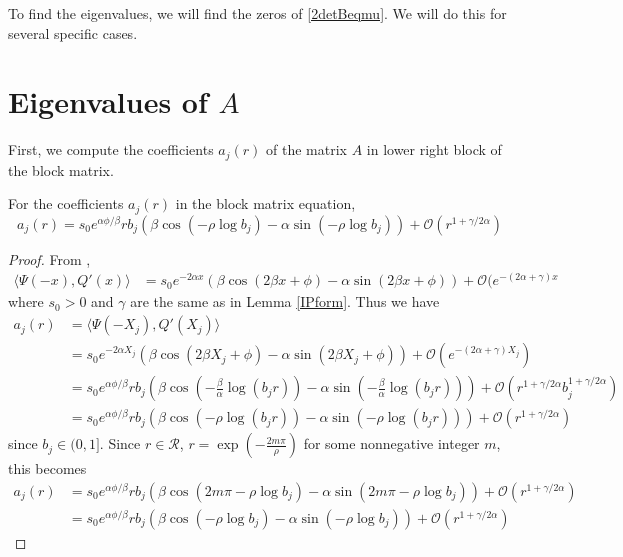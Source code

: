 \documentclass[thesis.tex]{subfiles}
\begin{document}
To find the eigenvalues, we will find the zeros of \cref{2detBeqmu}. We will do this for several specific cases.

\section{Eigenvalues of $A$}

First, we compute the coefficients $a_j(r)$ of the matrix $A$ in lower right block of the block matrix.

\begin{lemma}\label{lemma:ajparam}
For the coefficients $a_j(r)$ in the block matrix equation, 
\begin{equation}\label{ajparam}
a_j(r) = s_0 e^{\alpha \phi/\beta} r b_j \left( \beta \cos\left(-\rho \log b_j \right) - \alpha \sin \left(-\rho \log b_j \right) \right) + \mathcal{O}(r^{1+\gamma/2\alpha})
\end{equation}

\begin{proof}
From \cite[Lemma 6.1]{Sandstede1998},
\begin{align*}\label{IPpsiQprime}
\langle \Psi(-x), Q'(x) \rangle
&= s_0 e^{-2 \alpha x}\left( \beta \cos(2 \beta x + \phi) - \alpha \sin(2 \beta x + \phi)\right) + \mathcal{O}(e^{-(2 \alpha + \gamma) x}
\end{align*}
where $s_0 > 0$ and $\gamma$ are the same as in Lemma \ref{IPform}. Thus we have
\begin{align*}
a_j(r) &= \langle \Psi(-X_j), Q'(X_j) \rangle \\
&= s_0 e^{-2 \alpha X_j}\left( \beta \cos(2 \beta X_j + \phi) - \alpha \sin(2 \beta X_j + \phi)\right) + \mathcal{O}(e^{-(2 \alpha + \gamma) X_j}) \\
&= s_0 e^{\alpha \phi/\beta} r b_j \left( \beta \cos\left( -\frac{\beta}{\alpha} \log(b_j r) \right) - \alpha \sin \left( -\frac{\beta}{\alpha} \log(b_j r) \right) \right) + \mathcal{O}(r^{1+\gamma/2\alpha} b_j^{1 + \gamma/2\alpha}) \\
&= s_0 e^{\alpha \phi/\beta} r b_j \left( \beta \cos\left( -\rho \log(b_j r) \right) - \alpha \sin \left( -\rho \log(b_j r) \right) \right) + \mathcal{O}(r^{1+\gamma/2\alpha})
\end{align*}
since $b_j \in (0, 1]$. Since $r \in \mathcal{R}$, $r = \exp\left(-\frac{2 m \pi}{\rho}\right)$ for some nonnegative integer $m$, this becomes 
\begin{align*}
a_j(r) &= s_0 e^{\alpha \phi/\beta} r b_j \left( \beta \cos\left( 2 m \pi -\rho \log b_j \right) - \alpha \sin \left( 2 m \pi -\rho \log b_j \right) \right) + \mathcal{O}(r^{1+\gamma/2\alpha}) \\
&= s_0 e^{\alpha \phi/\beta} r b_j \left( \beta \cos\left(-\rho \log b_j \right) - \alpha \sin \left(-\rho \log b_j \right) \right) + \mathcal{O}(r^{1+\gamma/2\alpha})
\end{align*}
\end{proof}
\end{lemma}
\end{document}

